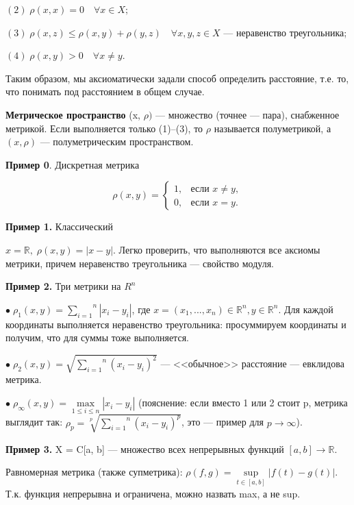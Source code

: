 \documentclass[12pt,a4paper]{article}
\begin{document}
$(2) \; \rho(x, x) = 0 \quad \forall x \in X;$

$(3) \; \rho(x, z) \leq \rho(x, y) + \rho(y, z) \quad \forall x, y, z \in X$ --- неравенство треугольника; 

$(4) \; \rho(x, y) > 0 \quad \forall x \neq y$. 

Таким образом, мы аксиоматически задали способ определить расстояние, т.е. то, что понимать под расстоянием в общем случае. 

\textbf{Метрическое пространство} (x, $\rho)$ --- множество (точнее --- пара), снабженное метрикой. Если выполняется только (1)--(3), то $\rho$ называется полуметрикой, а $(x, \rho)$ --- полуметрическим пространством. 

\textbf{Пример 0}. Дискретная метрика

\begin{equation*}
\rho(x, y) = 
\begin{cases}
1, &\text{если $x \neq y$},\\
0, &\text{если $x = y$}.
\end{cases}
\end{equation*}

\textbf{Пример 1.} Классический

$x = \mathbb{R}, \; \rho(x, y) = |x - y|$. Легко проверить, что выполняются все аксиомы метрики, причем неравенство треугольника --- свойство модуля. 

\textbf{Пример 2.} Три метрики на $R^n$

$\bullet \; \rho_1(x, y) = \overset{n}{\underset{i = 1}{\sum}}|x_{i} - y_{i}|$, где $x = (x_1, ..., x_n) \in \mathbb{R}^n, y \in \mathbb{R}^n$. Для каждой координаты выполняется неравенство треугольника: просуммируем координаты и получим, что для суммы тоже выполняется. 

$\bullet \; \rho_2(x, y) = \sqrt{\overset{n}{\underset{i = 1}{\sum}}(x_{i} - y_{i})^2}$ --- <<обычное>> расстояние --- евклидова метрика. 

$\bullet \; \rho_{\infty}(x, y) = \underset{1 \leq i \leq n}{\max} |x_{i} - y_{i}|$ (пояснение: если вместо 1 или 2 стоит p, метрика выглядит так: $\rho_{p} = \sqrt[p]{\overset{n}{\underset{i = 1}{\sum}}(x_{i} - y_{i})^{p}}$, это --- пример для $p \to \infty$). 

\textbf{Пример 3.} X = C[a, b] --- множество всех непрерывных функций $[a, b] \to \mathbb{R}$. 

Равномерная метрика (также супметрика): $\rho(f, g) = \underset{t \in [a, b]}{\sup}|f(t) - g(t)|$. Т.к. функция непрерывна и ограничена, можно назвать max, а не sup. 
\end{document}
